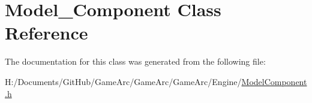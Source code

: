 \hypertarget{class_model___component}{\section{Model\+\_\+\+Component Class Reference}
\label{class_model___component}
}


The documentation for this class was generated from the following file\+:\begin{DoxyCompactItemize}
\item 
H\+:/\+Documents/\+Git\+Hub/\+Game\+Arc/\+Game\+Arc/\+Game\+Arc/\+Engine/\hyperlink{_model_component_8h}{Model\+Component.\+h}\end{DoxyCompactItemize}
